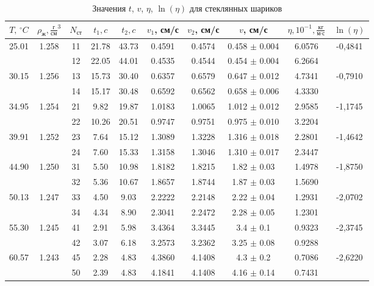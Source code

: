 \documentclass[a4paper,12pt]{article} %
\begin{document}
\begin{enumerate}
	\begin{table}[h!]
		\centering
		\begin{tabular}{|c|c|c|cc|cc|c|c|c|}
			\hline
			$T, \, ^\circ C$ & $\rho_\text{ж}, \frac{\text{г}}{\text{см}}^3$ & $N_{\text{ст}}$ & $t_1, c$ & $t_2, c$ & $v_1$, см/с & $v_2$, см/с & $v$, см/с & $\eta, 10^{-1}, \frac{\text{кг}}{\text{м·с}}$ & $\ln(\eta)$ \\
			\hline
			25.01 & 1.258 & 11 & 21.78 & 43.73 & 0.4591 & 0.4574 & 0.458 $\pm$ 0.004 & 6.0576 & -0,4841 \\
						&      & 12 & 22.05 & 44.01 & 0.4535 & 0.4544 & 0.454 $\pm$ 0.004 & 6.2664 &        \\
			30.15 & 1.256 & 13 & 15.73 & 30.40 & 0.6357 & 0.6579 & 0.647 $\pm$ 0.012 & 4.7341 & -0,7910 \\
						&      & 14 & 15.17 & 30.48 & 0.6592 & 0.6562 & 0.658 $\pm$ 0.006 & 4.3330 &        \\
			34.95 & 1.254 & 21 & 9.82  & 19.87 & 1.0183 & 1.0065 & 1.012 $\pm$ 0.012 & 2.9585 & -1,1745 \\
						&      & 22 & 10.26 & 20.51 & 0.9747 & 0.9751 & 0.975 $\pm$ 0.010& 3.2204 &        \\
			39.91 & 1.252 & 23 & 7.64  & 15.12 & 1.3089 & 1.3228 & 1.316 $\pm$ 0.018& 2.2801 & -1,4642 \\
						&      & 24 & 7.60  & 15.33 & 1.3158 & 1.3046 & 1.310 $\pm$ 0.017 & 2.3447 &        \\
			44.90 & 1.250 & 31 & 5.50  & 10.98 & 1.8182 & 1.8215 & 1.82 $\pm$ 0.03& 1.4978 & -1,8750 \\
						&      & 32 & 5.36  & 10.67 & 1.8657 & 1.8744 & 1.87 $\pm$ 0.03 & 1.5690 &        \\
			50.13 & 1.247 & 33 & 4.50  & 9.03  & 2.2222 & 2.2148 & 2.22 $\pm$ 0.04 & 1.2931 & -2,0702 \\
						&      & 34 & 4.34  & 8.90  & 2.3041 & 2.2472 & 2.28 $\pm$ 0.05 & 1.2301 &        \\
			55.30 & 1.245 & 41 & 2.91  & 5.98  & 3.4364 & 3.3445 & 3.4 $\pm$ 0.1 & 0.9323 & -2,3745 \\
						&      & 42 & 3.07  & 6.18  & 3.2573 & 3.2362 & 3.25 $\pm$ 0.08 & 0.9288 &        \\
			60.57 & 1.243 & 45 & 2.28  & 4.83  & 4.3860 & 4.1408 & 4.3 $\pm$ 0.2 & 0.7086 & -2,6220 \\
						&      & 50 & 2.39  & 4.83  & 4.1841 & 4.1408 & 4.16 $\pm$ 0.14 & 0.7431 &        \\
			\hline
		\end{tabular}
		\caption{Значения $t$, $v$, $\eta$, $\ln(\eta)$ для стеклянных шариков}
		\label{tab:glass_times}
	\end{table}


\end{enumerate}
\end{document}
